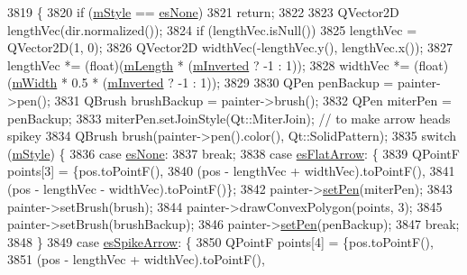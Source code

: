 \begin{DoxyCode}
3819                                                      \{
3820   \textcolor{keywordflow}{if} (\hyperlink{class_q_c_p_line_ending_a4696fc9117b60f1ca7690fcd2ba56611}{mStyle} == \hyperlink{class_q_c_p_line_ending_a5ef16e6876b4b74959c7261d8d4c2cd5aca12d500f50cd6871766801bac30fb03}{esNone})
3821     \textcolor{keywordflow}{return};
3822 
3823   QVector2D lengthVec(dir.normalized());
3824   \textcolor{keywordflow}{if} (lengthVec.isNull())
3825     lengthVec = QVector2D(1, 0);
3826   QVector2D widthVec(-lengthVec.y(), lengthVec.x());
3827   lengthVec *= (float)(\hyperlink{class_q_c_p_line_ending_ae8e1e2566b96c05736cd92662dba8af8}{mLength} * (\hyperlink{class_q_c_p_line_ending_a91306fe771d54c955e0af21af14349d5}{mInverted} ? -1 : 1));
3828   widthVec *= (float)(\hyperlink{class_q_c_p_line_ending_aca89d21341133c20dc6825c33a5eac48}{mWidth} * 0.5 * (\hyperlink{class_q_c_p_line_ending_a91306fe771d54c955e0af21af14349d5}{mInverted} ? -1 : 1));
3829 
3830   QPen penBackup = painter->pen();
3831   QBrush brushBackup = painter->brush();
3832   QPen miterPen = penBackup;
3833   miterPen.setJoinStyle(Qt::MiterJoin); \textcolor{comment}{// to make arrow heads spikey}
3834   QBrush brush(painter->pen().color(), Qt::SolidPattern);
3835   \textcolor{keywordflow}{switch} (\hyperlink{class_q_c_p_line_ending_a4696fc9117b60f1ca7690fcd2ba56611}{mStyle}) \{
3836   \textcolor{keywordflow}{case} \hyperlink{class_q_c_p_line_ending_a5ef16e6876b4b74959c7261d8d4c2cd5aca12d500f50cd6871766801bac30fb03}{esNone}:
3837     \textcolor{keywordflow}{break};
3838   \textcolor{keywordflow}{case} \hyperlink{class_q_c_p_line_ending_a5ef16e6876b4b74959c7261d8d4c2cd5a3d7dcea2f100671727c3417142154f8f}{esFlatArrow}: \{
3839     QPointF points[3] = \{pos.toPointF(),
3840                          (pos - lengthVec + widthVec).toPointF(),
3841                          (pos - lengthVec - widthVec).toPointF()\};
3842     painter->\hyperlink{class_q_c_p_painter_af9c7a4cd1791403901f8c5b82a150195}{setPen}(miterPen);
3843     painter->setBrush(brush);
3844     painter->drawConvexPolygon(points, 3);
3845     painter->setBrush(brushBackup);
3846     painter->\hyperlink{class_q_c_p_painter_af9c7a4cd1791403901f8c5b82a150195}{setPen}(penBackup);
3847     \textcolor{keywordflow}{break};
3848   \}
3849   \textcolor{keywordflow}{case} \hyperlink{class_q_c_p_line_ending_a5ef16e6876b4b74959c7261d8d4c2cd5ab9964d0d03f812d1e79de15edbeb2cbf}{esSpikeArrow}: \{
3850     QPointF points[4] = \{pos.toPointF(),
3851                          (pos - lengthVec + widthVec).toPointF(),

\end{DoxyCode}
